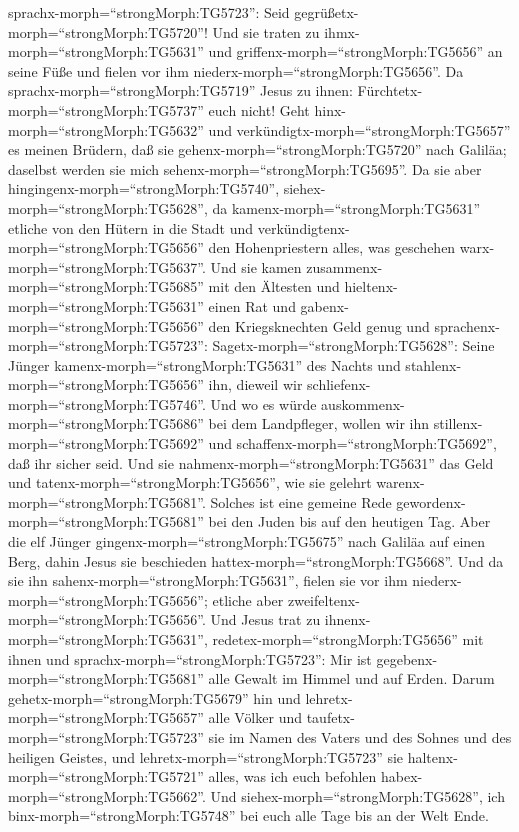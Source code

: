 sprachx-morph=``strongMorph:TG5723'': Seid
gegrüßetx-morph=``strongMorph:TG5720''! Und sie traten zu
ihmx-morph=``strongMorph:TG5631'' und
griffenx-morph=``strongMorph:TG5656'' an seine Füße und fielen vor ihm
niederx-morph=``strongMorph:TG5656''.  Da
sprachx-morph=``strongMorph:TG5719'' Jesus zu ihnen:
Fürchtetx-morph=``strongMorph:TG5737'' euch nicht! Geht
hinx-morph=``strongMorph:TG5632'' und
verkündigtx-morph=``strongMorph:TG5657'' es meinen Brüdern, daß sie
gehenx-morph=``strongMorph:TG5720'' nach Galiläa; daselbst werden sie
mich sehenx-morph=``strongMorph:TG5695''.  Da sie aber
hingingenx-morph=``strongMorph:TG5740'',
siehex-morph=``strongMorph:TG5628'', da
kamenx-morph=``strongMorph:TG5631'' etliche von den Hütern in die Stadt
und verkündigtenx-morph=``strongMorph:TG5656'' den Hohenpriestern alles,
was geschehen warx-morph=``strongMorph:TG5637''.  Und sie
kamen zusammenx-morph=``strongMorph:TG5685'' mit den Ältesten und
hieltenx-morph=``strongMorph:TG5631'' einen Rat und
gabenx-morph=``strongMorph:TG5656'' den Kriegsknechten Geld genug
 und sprachenx-morph=``strongMorph:TG5723'':
Sagetx-morph=``strongMorph:TG5628'': Seine Jünger
kamenx-morph=``strongMorph:TG5631'' des Nachts und
stahlenx-morph=``strongMorph:TG5656'' ihn, dieweil wir
schliefenx-morph=``strongMorph:TG5746''.  Und wo es würde
auskommenx-morph=``strongMorph:TG5686'' bei dem Landpfleger, wollen wir
ihn stillenx-morph=``strongMorph:TG5692'' und
schaffenx-morph=``strongMorph:TG5692'', daß ihr sicher seid.
 Und sie nahmenx-morph=``strongMorph:TG5631'' das Geld und
tatenx-morph=``strongMorph:TG5656'', wie sie gelehrt
warenx-morph=``strongMorph:TG5681''. Solches ist eine gemeine Rede
gewordenx-morph=``strongMorph:TG5681'' bei den Juden bis auf den
heutigen Tag.  Aber die elf Jünger
gingenx-morph=``strongMorph:TG5675'' nach Galiläa auf einen Berg, dahin
Jesus sie beschieden hattex-morph=``strongMorph:TG5668''. 
Und da sie ihn sahenx-morph=``strongMorph:TG5631'', fielen sie vor ihm
niederx-morph=``strongMorph:TG5656''; etliche aber
zweifeltenx-morph=``strongMorph:TG5656''.  Und Jesus trat
zu ihnenx-morph=``strongMorph:TG5631'',
redetex-morph=``strongMorph:TG5656'' mit ihnen und
sprachx-morph=``strongMorph:TG5723'': Mir ist
gegebenx-morph=``strongMorph:TG5681'' alle Gewalt im Himmel und auf
Erden.  Darum gehetx-morph=``strongMorph:TG5679'' hin und
lehretx-morph=``strongMorph:TG5657'' alle Völker und
taufetx-morph=``strongMorph:TG5723'' sie im Namen des Vaters und des
Sohnes und des heiligen Geistes,  und
lehretx-morph=``strongMorph:TG5723'' sie
haltenx-morph=``strongMorph:TG5721'' alles, was ich euch befohlen
habex-morph=``strongMorph:TG5662''. Und
siehex-morph=``strongMorph:TG5628'', ich
binx-morph=``strongMorph:TG5748'' bei euch alle Tage bis an der Welt
Ende.
